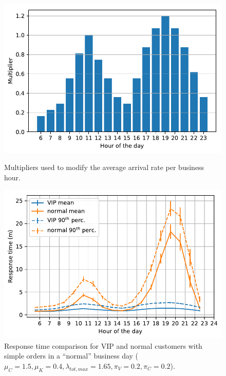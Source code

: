 \begin{figure}
  \begin{minipage}{0.48\textwidth}
    \centering
    \includegraphics[width=\textwidth]{figs/business_day/input_bd.pdf}
    \caption{Multipliers used to modify the average arrival rate per business hour.}
    \label{fig:bd:mul}
  \end{minipage}\hspace{0.03\textwidth}
  \begin{minipage}{0.48\textwidth}
    \centering
    \includegraphics[width=\textwidth]{figs/business_day/vip_vs_normal_simple.pdf}
    \caption{Response time comparison for VIP and normal customers with simple orders in a ``normal'' business day ($\mu_C=1.5, \mu_K=0.4, \lambda_{tot,max} = 1.65, \pi_V=0.2, \pi_C=0.2$).}
    \label{fig:bd:vip_vs_norm}
  \end{minipage}
\end{figure}

